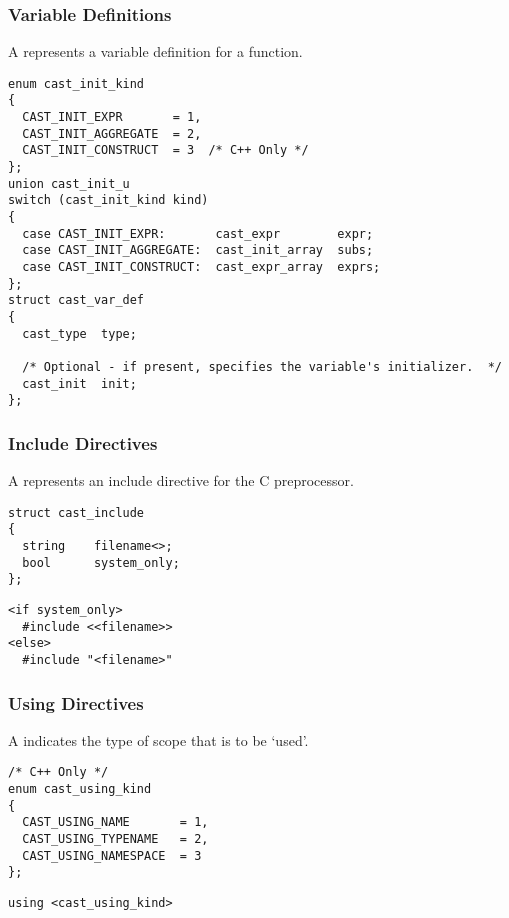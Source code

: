 \subsubsection{Variable Definitions}

A  represents a variable definition for a function.

\begin{verbatim}
enum cast_init_kind
{
  CAST_INIT_EXPR       = 1,
  CAST_INIT_AGGREGATE  = 2,
  CAST_INIT_CONSTRUCT  = 3  /* C++ Only */
};
union cast_init_u
switch (cast_init_kind kind)
{
  case CAST_INIT_EXPR:       cast_expr        expr;
  case CAST_INIT_AGGREGATE:  cast_init_array  subs;
  case CAST_INIT_CONSTRUCT:  cast_expr_array  exprs;
};
struct cast_var_def
{
  cast_type  type;

  /* Optional - if present, specifies the variable's initializer.  */
  cast_init  init;
};
\end{verbatim}

\subsubsection{Include Directives}

A  represents an include directive for the C preprocessor.

\begin{verbatim}
struct cast_include
{
  string    filename<>;
  bool      system_only;
};
\end{verbatim}

\begin{verbatim}
<if system_only>
  #include <<filename>>
<else>
  #include "<filename>"
\end{verbatim}

\subsubsection{Using Directives}

A  indicates the type of scope that is to be `used'.

\begin{verbatim}
/* C++ Only */
enum cast_using_kind
{
  CAST_USING_NAME       = 1,
  CAST_USING_TYPENAME   = 2,
  CAST_USING_NAMESPACE  = 3
};
\end{verbatim}

\begin{verbatim}
using <cast_using_kind>
\end{verbatim}

